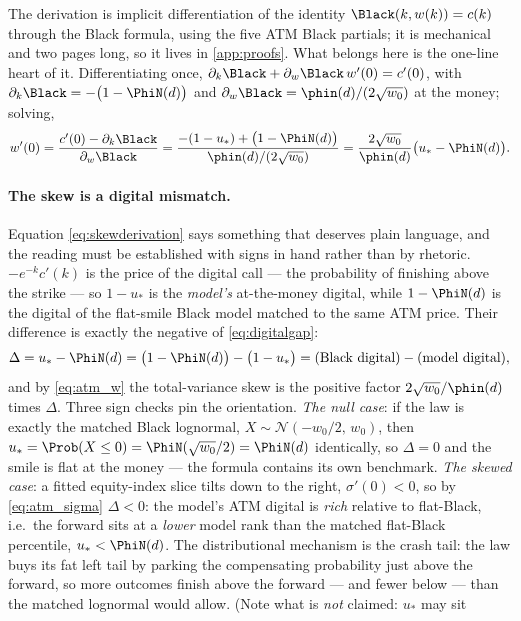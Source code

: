 The derivation is implicit differentiation of the identity
$\Black(k,w(k))=c(k)$ through the Black formula, using the five ATM Black
partials; it is mechanical and two pages long, so it lives in
\cref{app:proofs}.  What belongs here is the one-line heart of it.
Differentiating once,
$\partial_k\Black+\partial_w\Black\,w'(0)=c'(0)$, with
$\partial_k\Black=-\big(1-\PhiN(d)\big)$ and
$\partial_w\Black=\phin(d)/(2\sqrt{w_0})$ at the money; solving,
\begin{equation}
w'(0)
=\frac{c'(0)-\partial_k\Black}{\partial_w\Black}
=\frac{-(1-u_*)+\big(1-\PhiN(d)\big)}{\phin(d)/(2\sqrt{w_0})}
=\frac{2\sqrt{w_0}}{\phin(d)}\big(u_*-\PhiN(d)\big).
\label{eq:skewderivation}
\end{equation}

\paragraph{The skew is a digital mismatch.}
Equation \eqref{eq:skewderivation} says something that deserves plain
language, and the reading must be established with signs in hand rather
than by rhetoric.  $-e^{-k}c'(k)$ is the price of the digital call ---
the probability of finishing above the strike --- so $1-u_*$ is the
\emph{model's} at-the-money digital, while $1-\PhiN(d)$ is the digital
of the flat-smile Black model matched to the same ATM price.  Their
difference is exactly the negative of \eqref{eq:digitalgap}:
\[
\Delta=u_*-\PhiN(d)
=\big(1-\PhiN(d)\big)-\big(1-u_*\big)
=\text{(Black digital)}-\text{(model digital)} ,
\]
and by \eqref{eq:atm_w} the total-variance skew is the positive factor
$2\sqrt{w_0}/\phin(d)$ times $\Delta$.  Three sign checks pin the
orientation.  \emph{The null case}: if the law is exactly the matched
Black lognormal, $X\sim\mathcal N(-w_0/2,\,w_0)$, then
$u_*=\Prob(X\le0)=\PhiN(\sqrt{w_0}/2)=\PhiN(d)$ identically, so
$\Delta=0$ and the smile is flat at the money --- the formula contains
its own benchmark.  \emph{The skewed case}: a fitted equity-index slice
tilts down to the right, $\sigma'(0)<0$, so by \eqref{eq:atm_sigma}
$\Delta<0$: the model's ATM digital is \emph{rich} relative to
flat-Black, i.e.\ the forward sits at a \emph{lower} model rank than
the matched flat-Black percentile, $u_*<\PhiN(d)$.  The distributional
mechanism is the crash tail: the law buys its fat left tail by parking
the compensating probability just above the forward, so more outcomes
finish above the forward --- and fewer below --- than the matched
lognormal would allow.  (Note what is \emph{not} claimed: $u_*$ may sit
